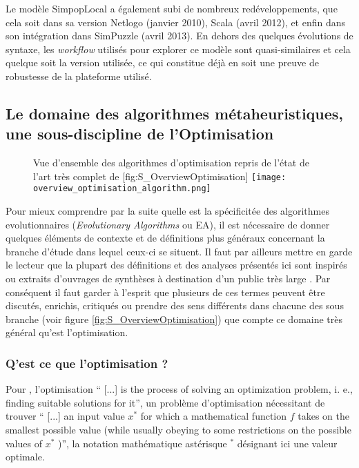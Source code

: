 Le modèle SimpopLocal a également subi de nombreux redéveloppements, que cela soit dans sa version Netlogo (janvier 2010), Scala (avril 2012), et enfin dans son intégration dans SimPuzzle (avril 2013). En dehors des quelques évolutions de syntaxe, les \textit{workflow} utilisés pour explorer ce modèle sont quasi-similaires et cela quelque soit la version utilisée, ce qui constitue déjà en soit  une preuve de robustesse de la plateforme utilisé.




\subsection{Le domaine des algorithmes métaheuristiques, une sous-discipline de l'Optimisation}

\begin{figure}[h]
\begin{sidecaption}[fortoc]{ Vue d'ensemble des algorithmes d'optimisation repris de l'état de l'art très complet de \textcite[32]{Weise2011}}[fig:S_OverviewOptimisation]
  \centering
 \texttt{[image: overview\_optimisation\_algorithm.png]}
  \end{sidecaption}
\end{figure}

Pour mieux comprendre par la suite quelle est la spécificitée des algorithmes evolutionnaires (\textit{Evolutionary Algorithms} ou EA), il est nécessaire de donner quelques éléments de contexte et de définitions plus généraux concernant la branche d'étude dans lequel ceux-ci se situent. Il faut par ailleurs mettre en garde le lecteur que la plupart des définitions et des analyses présentés ici sont inspirés ou extraits d'ouvrages de synthèses à destination d'un public très large \autocites{Weise2011, Luke2013, Brownlee2012}. Par conséquent il faut garder à l'esprit que plusieurs de ces termes peuvent être discutés, enrichis, critiqués ou prendre des sens différents dans chacune des sous branche (voir figure \ref{fig:S_OverviewOptimisation}) que compte ce domaine très général qu'est l'optimisation.

\subsubsection{Q'est ce que l'optimisation ?}
\label{sssec:Optimisation}

Pour \textcite[22]{Weise2011}, l'optimisation \foreignquote{english}{ [...] is the process of solving an optimization problem, i. e., finding suitable solutions for it}, un problème d'optimisation nécessitant de trouver \foreignquote{english}{ [...] an input value $x^*$ for which a mathematical function $f$ takes on the smallest possible value (while usually obeying to some restrictions on the possible values of $x^*$ )}, la notation mathématique astérisque $^*$ désignant ici une valeur optimale.


